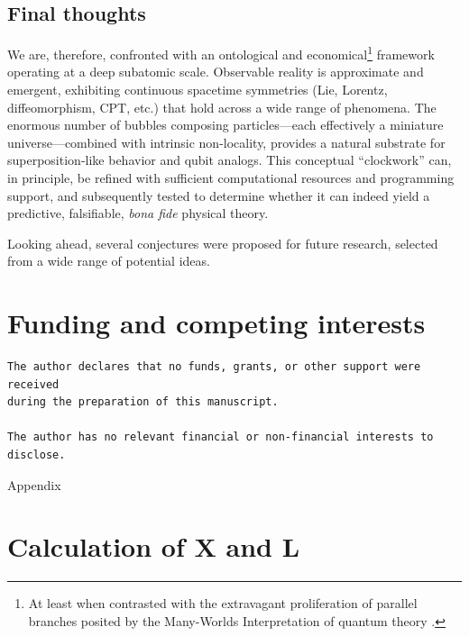 \documentclass[12pt]{article}
\begin{document}
\subsection{Final thoughts}

We are, therefore, confronted with an ontological and economical\footnote{At least when contrasted with the extravagant proliferation of parallel branches posited by the Many-Worlds Interpretation of quantum theory \cite{everett1957}.} framework operating at a deep subatomic scale. Observable reality is approximate and emergent, exhibiting continuous spacetime symmetries (Lie, Lorentz, diffeomorphism, CPT, etc.) that hold across a wide range of phenomena. The enormous number of bubbles composing particles—each effectively a miniature universe—combined with intrinsic non-locality, provides a natural substrate for superposition-like behavior and qubit analogs. This conceptual “clockwork” can, in principle, be refined with sufficient computational resources and programming support, and subsequently tested to determine whether it can indeed yield a predictive, falsifiable, \emph{bona fide} physical theory.

Looking ahead, several conjectures were proposed for future research, selected from a wide range of potential ideas.


\section*{Funding and competing interests}
\begin{verbatim}
The author declares that no funds, grants, or other support were received 
during the preparation of this manuscript.

The author has no relevant financial or non-financial interests to disclose.
\end{verbatim}





\newpage{}


\appendix
\begin{center}
{\LARGE{}Appendix}{\LARGE\par}
\par\end{center}

\section{Calculation of X and L\label{sec:Calculation-of-X}}
\end{document}
